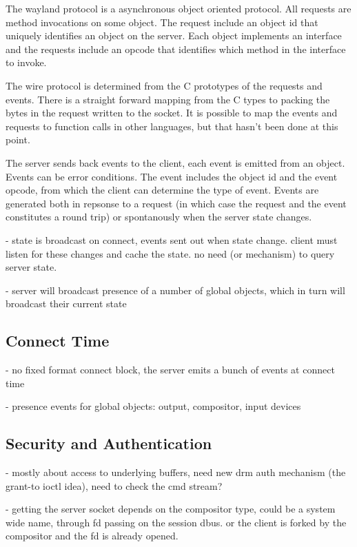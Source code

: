 \documentclass{article}
\begin{document}
The wayland protocol is a asynchronous object oriented protocol.  All
requests are method invocations on some object.  The request include
an object id that uniquely identifies an object on the server.  Each
object implements an interface and the requests include an opcode that
identifies which method in the interface to invoke.

The wire protocol is determined from the C prototypes of the requests
and events.  There is a straight forward mapping from the C types to
packing the bytes in the request written to the socket.  It is
possible to map the events and requests to function calls in other
languages, but that hasn't been done at this point.

The server sends back events to the client, each event is emitted from
an object.  Events can be error conditions.  The event includes the
object id and the event opcode, from which the client can determine
the type of event.  Events are generated both in repsonse to a request
(in which case the request and the event constitutes a round trip) or
spontanously when the server state changes.

    - state is broadcast on connect, events sent out when state
      change.  client must listen for these changes and cache the state.
      no need (or mechanism) to query server state.

    - server will broadcast presence of a number of global objects,
      which in turn will broadcast their current state

\subsection{Connect Time}

 - no fixed format connect block, the server emits a bunch of events
   at connect time

 - presence events for global objects: output, compositor, input devices

\subsection{Security and Authentication}

 - mostly about access to underlying buffers, need new drm auth
   mechanism (the grant-to ioctl idea), need to check the cmd stream?

 - getting the server socket depends on the compositor type, could be
   a system wide name, through fd passing on the session dbus. or the
   client is forked by the compositor and the fd is already opened.
\end{document}
